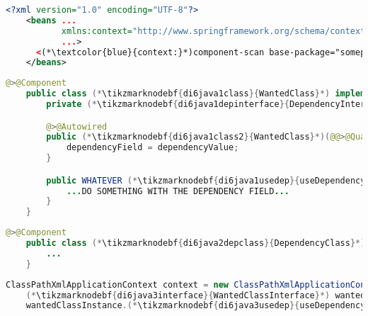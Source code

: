\enlargethispage{20mm}
\thispagestyle{empty}
\begin{lstlisting}[language=XML, title={Configuration XML}]
    <?xml version="1.0" encoding="UTF-8"?>
    <beans ...
           xmlns:context="http://www.springframework.org/schema/context"
           ...>
      <(*\textcolor{blue}{context:}*)component-scan base-package="somepackage.subpackage"/>
    </beans>
\end{lstlisting}
\begin{lstlisting}[language=Java, title={Wanted class with the constructor}]
    @>@Component
    public class (*\tikzmarknodebf{di6java1class}{WantedClass}*) implements (*\tikzmarknodebf{di6java1interface}{WantedClassInterface}*) {
        private (*\tikzmarknodebf{di6java1depinterface}{DependencyInterface}*) dependencyField;

        @>@Autowired
        public (*\tikzmarknodebf{di6java1class2}{WantedClass}*)(@@>@Qualifier<@@("(*\tikzmarknodebf{di6java1depbeanid}{dependencyClass}[ForestGreen]*)") (*\tikzmarknodebf{di6java1depinterface2}{DependencyInterface}*) dependencyValue) {
            dependencyField = dependencyValue;
        }

        public WHATEVER (*\tikzmarknodebf{di6java1usedep}{useDependency}*)() {
            ...DO SOMETHING WITH THE DEPENDENCY FIELD...
        }
    }
\end{lstlisting}
\begin{lstlisting}[language=Java, title={Dependency class}]
    @>@Component
    public class (*\tikzmarknodebf{di6java2depclass}{DependencyClass}*) implements (*\tikzmarknodebf{di6java2depinterface}{DependencyInterface}*) {
        ...
    }
\end{lstlisting}
\begin{lstlisting}[language=Java, title={Usage}]
    ClassPathXmlApplicationContext context = new ClassPathXmlApplicationContext("configurationFile.xml");
    (*\tikzmarknodebf{di6java3interface}{WantedClassInterface}*) wantedClassInstance = context.getBean("(*\tikzmarknodebf{di6java3beanid}{wantedClass}[ForestGreen]*)", (*\tikzmarknodebf{di6java3interface2}{WantedClassInterface}*).class);
    wantedClassInstance.(*\tikzmarknodebf{di6java3usedep}{useDependency}*)();
\end{lstlisting}
\newpage

